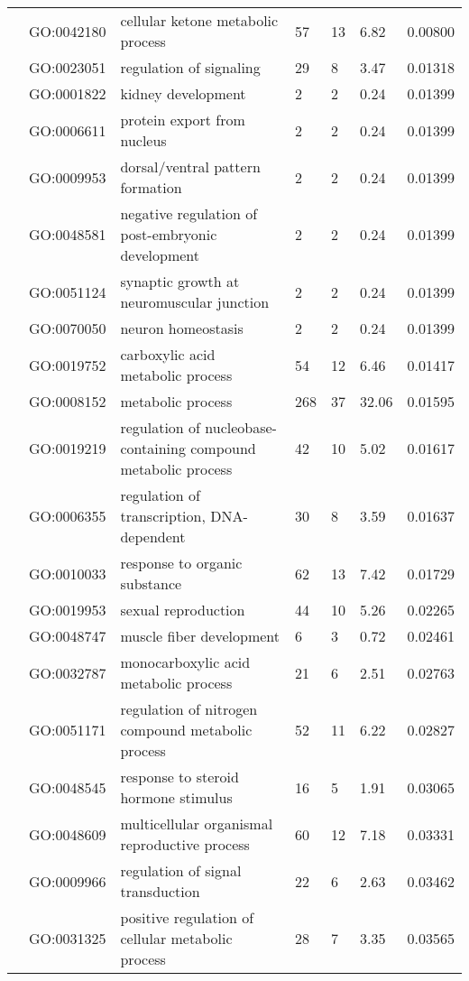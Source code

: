\documentclass[10pt]{bmc_article}
\newenvironment{bmcformat}{\begin{raggedright}\baselineskip20pt\sloppy\setboolean{publ}{false}}{\end{raggedright}\baselineskip20pt\sloppy}
\begin{document}
\begin{bmcformat}
\begin{longtable}{p{1.7cm}lp{4.5cm}p{1cm}p{1cm}ll}
   & GO:0042180 & cellular ketone metabolic process &  57 &  13 & 6.82 & 0.00800 \\ 
   & GO:0023051 & regulation of signaling &  29 &   8 & 3.47 & 0.01318 \\ 
   & GO:0001822 & kidney development &   2 &   2 & 0.24 & 0.01399 \\ 
   & GO:0006611 & protein export from nucleus &   2 &   2 & 0.24 & 0.01399 \\ 
   & GO:0009953 & dorsal/ventral pattern formation &   2 &   2 & 0.24 & 0.01399 \\ 
   & GO:0048581 & negative regulation of post-embryonic development &   2 &   2 & 0.24 & 0.01399 \\ 
   & GO:0051124 & synaptic growth at neuromuscular junction &   2 &   2 & 0.24 & 0.01399 \\ 
   & GO:0070050 & neuron homeostasis &   2 &   2 & 0.24 & 0.01399 \\ 
   & GO:0019752 & carboxylic acid metabolic process &  54 &  12 & 6.46 & 0.01417 \\ 
   & GO:0008152 & metabolic process & 268 &  37 & 32.06 & 0.01595 \\ 
   & GO:0019219 & regulation of nucleobase-containing compound metabolic process &  42 &  10 & 5.02 & 0.01617 \\ 
   & GO:0006355 & regulation of transcription, DNA-dependent &  30 &   8 & 3.59 & 0.01637 \\ 
   & GO:0010033 & response to organic substance &  62 &  13 & 7.42 & 0.01729 \\ 
   & GO:0019953 & sexual reproduction &  44 &  10 & 5.26 & 0.02265 \\ 
   & GO:0048747 & muscle fiber development &   6 &   3 & 0.72 & 0.02461 \\ 
   & GO:0032787 & monocarboxylic acid metabolic process &  21 &   6 & 2.51 & 0.02763 \\ 
   & GO:0051171 & regulation of nitrogen compound metabolic process &  52 &  11 & 6.22 & 0.02827 \\ 
   & GO:0048545 & response to steroid hormone stimulus &  16 &   5 & 1.91 & 0.03065 \\ 
   & GO:0048609 & multicellular organismal reproductive process &  60 &  12 & 7.18 & 0.03331 \\ 
   & GO:0009966 & regulation of signal transduction &  22 &   6 & 2.63 & 0.03462 \\ 
   & GO:0031325 & positive regulation of cellular metabolic process &  28 &   7 & 3.35 & 0.03565 \\ 

\end{longtable}
\end{bmcformat}
\end{document}
